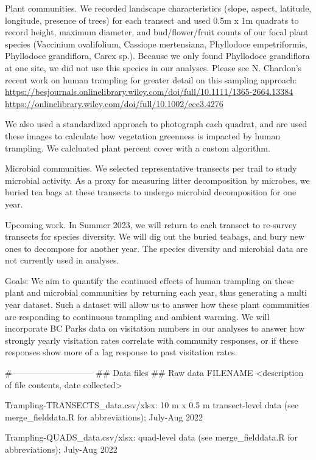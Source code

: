 \documentclass[
]{article}
\begin{document}
Plant communities. We recorded landscape characteristics (slope, aspect,
latitude, longitude, presence of trees) for each transect and used 0.5m
x 1m quadrats to record height, maximum diameter, and bud/flower/fruit
counts of our focal plant species (Vaccinium ovalifolium, Cassiope
mertensiana, Phyllodoce empetriformis, Phyllodoce grandiflora, Carex
sp.). Because we only found Phyllodoce grandiflora at one site, we did
not use this species in our analyses. Please see N. Chardon's recent
work on human trampling for greater detail on this sampling approach:
\url{https://besjournals.onlinelibrary.wiley.com/doi/full/10.1111/1365-2664.13384}
\url{https://onlinelibrary.wiley.com/doi/full/10.1002/ece3.4276}

We also used a standardized approach to photograph each quadrat, and are
used these images to calculate how vegetation greenness is impacted by
human trampling. We calcluated plant percent cover with a custom
algorithm.

Microbial communities. We selected representative transects per trail to
study microbial activity. As a proxy for measuring litter decomposition
by microbes, we buried tea bags at these transects to undergo microbial
decomposition for one year.

Upcoming work. In Summer 2023, we will return to each transect to
re-survey transects for species diversity. We will dig out the buried
teabags, and bury new ones to decompose for another year. The species
diversity and microbial data are not currently used in analyses.

Goals: We aim to quantify the continued effects of human trampling on
these plant and microbial communities by returning each year, thus
generating a multi year dataset. Such a dataset will allow us to answer
how these plant communities are responding to continuous trampling and
ambient warming. We will incorporate BC Parks data on visitation numbers
in our analyses to answer how strongly yearly visitation rates correlate
with community responses, or if these responses show more of a lag
response to past visitation rates.

\#----------------------------- \#\# Data files \#\# Raw data FILENAME
\textless description of file contents, date collected\textgreater{}

Trampling-TRANSECTS\_data.csv/xlsx: 10 m x 0.5 m transect-level data
(see merge\_fielddata.R for abbreviations); July-Aug 2022

Trampling-QUADS\_data.csv/xlsx: quad-level data (see merge\_fielddata.R
for abbreviations); July-Aug 2022
\end{document}
